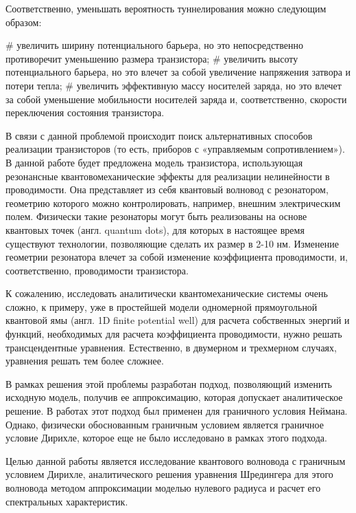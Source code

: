 Соответственно, уменьшать вероятность туннелирования можно следующим образом:

\begin{easylist}[itemize]
# увеличить ширину потенциального барьера, но это непосредственно противоречит уменьшению размера транзистора;
# увеличить высоту потенциального барьера, но это влечет за собой увеличение напряжения затвора и потери тепла;
# увеличить эффективную массу носителей заряда, но это влечет за собой уменьшение мобильности носителей заряда и, соответственно, скорости переключения состояния транзистора.
\end{easylist}

В связи с данной проблемой происходит поиск альтернативных способов реализации транзисторов (то есть, приборов с «управляемым сопротивлением»). В данной работе будет предложена модель транзистора, использующая резонансные квантовомеханические эффекты для реализации нелинейности в проводимости. Она представляет из себя квантовый волновод с резонатором, геометрию которого можно контролировать, например, внешним электрическим полем. Физически такие резонаторы могут быть реализованы на основе квантовых точек (англ. quantum dots), для которых в настоящее время существуют технологии, позволяющие сделать их размер в 2-10 нм. Изменение геометрии резонатора влечет за собой изменение коэффициента проводимости, и, соответственно, проводимости транзистора.

К сожалению, исследовать аналитически квантомеханические системы очень сложно, к примеру, уже в простейшей модели одномерной прямоугольной квантовой ямы (англ. 1D finite potential well) для расчета собственных энергий и функций, необходимых для расчета коэффициента проводимости, нужно решать трансцендентные уравнения. Естественно, в двумерном и трехмерном случаях, уравнения решать тем более сложнее.

В рамках решения этой проблемы разработан подход, позволяющий изменить исходную модель, получив ее аппроксимацию, которая допускает аналитическое решение. В работах \cite{popov1992extension, popov1992resonator, popov1993zero} этот подход был применен для граничного условия Неймана. Однако, физически обоснованным граничным условием является граничное условие Дирихле, которое еще не было исследовано в рамках этого подхода.

Целью данной работы является исследование квантового волновода с граничным условием Дирихле, аналитического решения уравнения Шредингера для этого волновода методом аппроксимации моделью нулевого радиуса и расчет его спектральных характеристик.